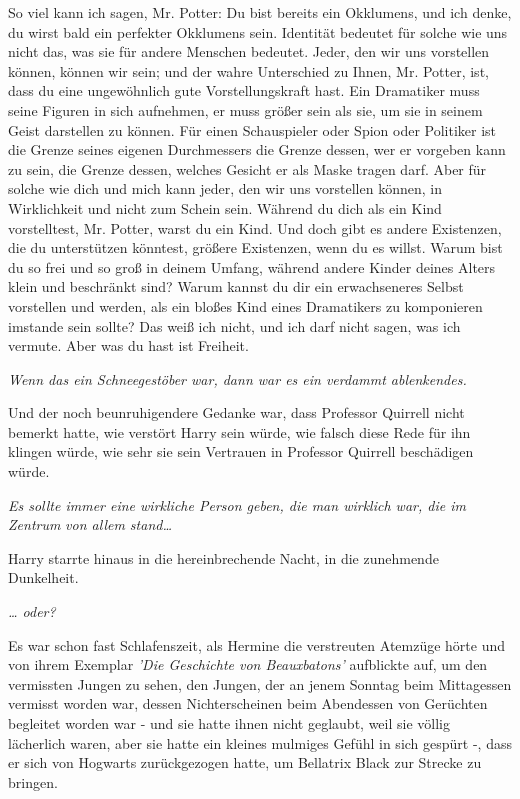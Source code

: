 {So viel kann ich sagen, Mr. Potter: Du bist bereits ein Okklumens, und ich denke, du wirst bald ein perfekter Okklumens sein. Identität bedeutet für solche wie uns nicht das, was sie für andere Menschen bedeutet. Jeder, den wir uns vorstellen können, können wir sein; und der wahre Unterschied zu Ihnen, Mr. Potter, ist, dass du eine ungewöhnlich gute Vorstellungskraft hast. Ein Dramatiker muss seine Figuren in sich aufnehmen, er muss größer sein als sie, um sie in seinem Geist darstellen zu können. Für einen Schauspieler oder Spion oder Politiker ist die Grenze seines eigenen Durchmessers die Grenze dessen, wer er vorgeben kann zu sein, die Grenze dessen, welches Gesicht er als Maske tragen darf. Aber für solche wie dich und mich kann jeder, den wir uns vorstellen können, in Wirklichkeit und nicht zum Schein sein. Während du dich als ein Kind vorstelltest, Mr. Potter, warst du ein Kind. Und doch gibt es andere Existenzen, die du unterstützen könntest, größere Existenzen, wenn du es willst. Warum bist du so frei und so groß in deinem Umfang, während andere Kinder deines Alters klein und beschränkt sind? Warum kannst du dir ein erwachseneres Selbst vorstellen und werden, als ein bloßes Kind eines Dramatikers zu komponieren imstande sein sollte? Das weiß ich nicht, und ich darf nicht sagen, was ich vermute. Aber was du hast ist Freiheit.

\emph{Wenn das ein Schneegestöber war, dann war es ein verdammt ablenkendes.}

Und der noch beunruhigendere Gedanke war, dass Professor Quirrell nicht bemerkt hatte, wie verstört Harry sein würde, wie falsch diese Rede für ihn klingen würde, wie sehr sie sein Vertrauen in Professor Quirrell beschädigen würde.

\emph{Es sollte immer eine wirkliche Person geben, die man wirklich war, die im Zentrum} \emph{von allem stand…}

Harry starrte hinaus in die hereinbrechende Nacht, in die zunehmende Dunkelheit.

\emph{… oder?}

Es war schon fast Schlafenszeit, als Hermine die verstreuten Atemzüge hörte und von ihrem Exemplar \emph{'Die Geschichte von Beauxbatons'} aufblickte auf, um den vermissten Jungen zu sehen, den Jungen, der an jenem Sonntag beim Mittagessen vermisst worden war, dessen Nichterscheinen beim Abendessen von Gerüchten begleitet worden war - und sie hatte ihnen nicht geglaubt, weil sie völlig lächerlich waren, aber sie hatte ein kleines mulmiges Gefühl in sich gespürt -, dass er sich von Hogwarts zurückgezogen hatte, um Bellatrix Black zur Strecke zu bringen.

}
